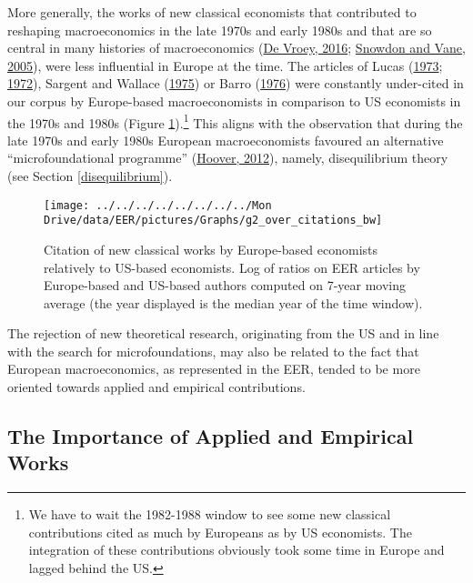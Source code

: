 \documentclass[
  12pt,
  onecolumn]{article}
\begin{document}
More generally, the works of new classical economists that contributed to reshaping macroeconomics in the late 1970s and early 1980s and that are so central in many histories of macroeconomics (\protect\hyperlink{ref-devroey2016}{De Vroey, 2016}; \protect\hyperlink{ref-snowdon2005}{Snowdon and Vane, 2005}), were less influential in Europe at the time. The articles of Lucas (\protect\hyperlink{ref-lucas1973}{1973}; \protect\hyperlink{ref-lucas1972}{1972}), Sargent and Wallace (\protect\hyperlink{ref-sargent1975}{1975}) or Barro (\protect\hyperlink{ref-barro1976}{1976}) were constantly under-cited in our corpus by Europe-based macroeconomists in comparison to US economists in the 1970s and 1980s (Figure \ref{fig:plot-new-classical}).\footnote{We have to wait the 1982-1988 window to see some new classical contributions cited as much by Europeans as by US economists. The integration of these contributions obviously took some time in Europe and lagged behind the US.} This aligns with the observation that during the late 1970s and early 1980s European macroeconomists favoured an alternative ``microfoundational programme'' (\protect\hyperlink{ref-hoover2012}{Hoover, 2012}), namely, disequilibrium theory (see Section \ref{disequilibrium}).

\begin{figure}[H]

{\centering \texttt{[image: ../../../../../../../../Mon Drive/data/EER/pictures/Graphs/g2\_over\_citations\_bw]} 

}

\caption{Citation of new classical works by Europe-based economists relatively to US-based economists. Log of ratios on EER articles by Europe-based and US-based authors computed on 7-year moving average (the year displayed is the median year of the time window).}\label{fig:plot-new-classical}
\end{figure}

The rejection of new theoretical research, originating from the US and in line with the search for microfoundations, may also be related to the fact that European macroeconomics, as represented in the EER, tended to be more oriented towards applied and empirical contributions.

\hypertarget{the-importance-of-applied-and-empirical-works}{%
\subsection{The Importance of Applied and Empirical Works}\label{the-importance-of-applied-and-empirical-works}}
\end{document}
